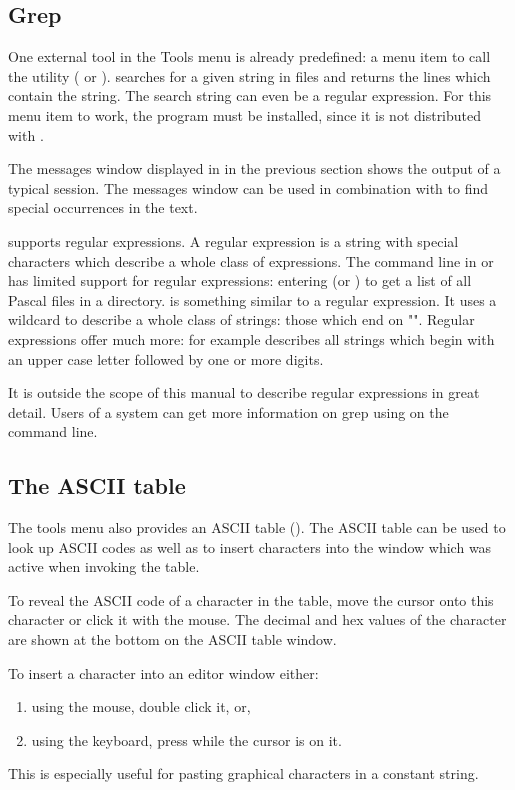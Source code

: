 \subsection{Grep}
\label{se:grep}
One external tool in the Tools menu is already predefined: a
menu item to call the  utility ( or
).  searches for a given string in files and
returns the lines which contain the string. The search string can
even be a regular expression. For this menu item to work, the
 program must be installed, since it is not distributed
with \fpc.

The messages window displayed in  in the previous
section shows the output of a typical  session. The messages
window can be used in combination with  to find special
occurrences in the text.

 supports regular expressions. A regular expression is a
string with special characters which describe a whole class of
expressions. The command line in \dos or \linux has limited
support for regular expressions: entering 
(or ) to get a list of all Pascal files in a
directory.  is something similar to a regular expression.
It uses a wildcard to describe a whole class of strings: those which
end on "".
Regular expressions offer much more: for example \var{[A-Z][0-9]+}
describes all strings which begin with an upper case letter followed by
one or more digits.

It is outside the scope of this manual to describe regular expressions
in great detail. Users of a \linux system can get more information on grep
using  on the command line.
%
%
\subsection{The ASCII table}
\label{se:asciitable}
The tools menu also provides an ASCII table ().
The ASCII table can be used to look up ASCII codes as well as to
insert characters into the window which was active when invoking the
table. 

To reveal the ASCII code of a character in the table, move the
cursor onto this character or click it with the mouse. The decimal
and hex values of the character are shown at the bottom on the
ASCII table window.

To insert a character into an editor window either:
\begin{enumerate}
\item using the mouse, double click it, or,
\item using the keyboard, press  while the cursor is on it.
\end{enumerate}
This is especially useful for pasting graphical characters in a constant
string.

